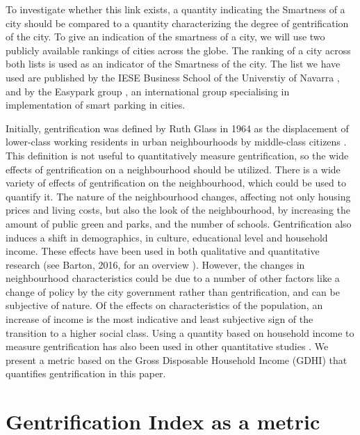 \documentclass[a4paper, 10pt, conference]{ieeeconf}      %
\begin{document}
To investigate whether this link exists, a quantity indicating the Smartness
of a city should be compared to a quantity characterizing the degree of gentrification
of the city. To give an indication of the smartness of a city, we will use two publicly
available rankings of cities across the globe. The ranking of a city across both lists
is used as an indicator of the Smartness of the city. The list we have used are published
by the IESE Business School of the Universtiy of Navarra \cite{c1}, and by the Easypark group \cite{c2},
an international group specialising in implementation of smart parking in cities.

Initially, gentrification was defined by Ruth Glass in 1964 as the displacement of lower-class
working residents in urban neighbourhoods by middle-class citizens \cite{gentr_def}. This definition
is not useful to quantitatively measure gentrification, so the wide effects of gentrification on a neighbourhood should be utilized.
There is a wide variety of effects of gentrification on the neighbourhood, which could be used
to quantify it. The nature of the neighbourhood changes, affecting not only housing prices and
living costs, but also the look of the neighbourhood, by increasing the amount of public green
and parks, and the number of schools. Gentrification also induces a shift in demographics, in
culture, educational level and household income. These effects have been used in both qualitative
and quantitative research (see Barton, 2016, for an overview \cite{Barton}). However, the changes
in neighbourhood characteristics could be due to a number of other factors like a change of policy
by the city government rather than gentrification, and can be subjective of nature. Of the effects
on characteristics of the population, an increase of income is the most indicative and least 
subjective sign of the transition to a higher social class. Using a quantity based on household
income to measure gentrification has also been used in other quantitative studies \cite{gentr_research}.
We present a metric based on the Gross Disposable Household Income (GDHI) that quantifies gentrification
in this paper.


\section{Gentrification Index as a metric}
\label{sec:Gentrification}
\end{document}
